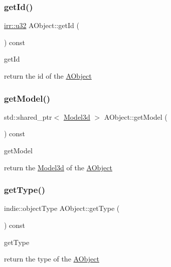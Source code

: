 \subsubsection{\texorpdfstring{get\+Id()}{getId()}}
{\footnotesize\ttfamily \hyperlink{namespaceirr_a0416a53257075833e7002efd0a18e804}{irr\+::u32} A\+Object\+::get\+Id (\begin{DoxyParamCaption}{ }\end{DoxyParamCaption}) const}



get\+Id 

return the id of the \hyperlink{classAObject}{A\+Object} \mbox{\label{classAObject_a3ffaa331c1842c5bf782c9a0343474bc}} 
\subsubsection{\texorpdfstring{get\+Model()}{getModel()}}
{\footnotesize\ttfamily std\+::shared\+\_\+ptr$<$ \hyperlink{classModel3d}{Model3d} $>$ A\+Object\+::get\+Model (\begin{DoxyParamCaption}{ }\end{DoxyParamCaption}) const}



get\+Model 

return the \hyperlink{classModel3d}{Model3d} of the \hyperlink{classAObject}{A\+Object} \mbox{\label{classAObject_afcbaa047c0d02ca29b76875157a1eb1e}} 
\subsubsection{\texorpdfstring{get\+Type()}{getType()}}
{\footnotesize\ttfamily indie\+::object\+Type A\+Object\+::get\+Type (\begin{DoxyParamCaption}{ }\end{DoxyParamCaption}) const}



get\+Type 

return the type of the \hyperlink{classAObject}{A\+Object} \mbox{\label{classAObject_aebbd61ad13e23fa7787a5cdf12acd4ca}} 
